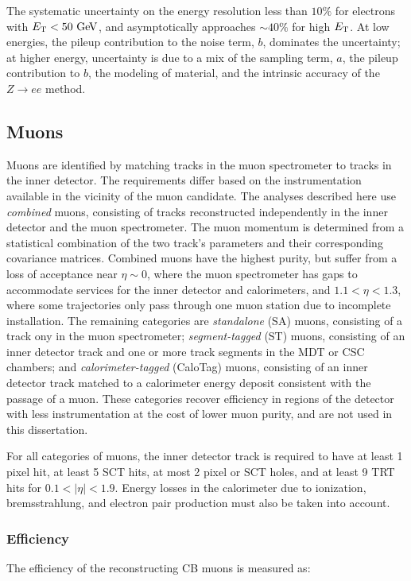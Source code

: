The systematic uncertainty on the energy resolution less than $10\%$ for electrons with $\Et<50 \GeV$, and asymptotically approaches $\sim 40\%$ for high $E_{\mathrm{T}}$. At low energies, the pileup contribution to the noise term, $b$, dominates the uncertainty; at higher energy, uncertainty is due to a mix of the sampling term, $a$, the pileup contribution to $b$, the modeling of material, and the intrinsic accuracy of the $Z\rightarrow ee$ method.


\subsection{Muons}\label{sec:event-reconstruction-muons}
Muons are identified by matching tracks in the muon spectrometer to tracks in the inner detector. The requirements differ based on the instrumentation available in the vicinity of the muon candidate. The analyses described here use \emph{combined} muons, consisting of tracks reconstructed independently in the inner detector and the muon spectrometer. The muon momentum is determined from a statistical combination of the two track's parameters and their corresponding covariance matrices. Combined muons have the highest purity, but suffer from a loss of acceptance near $\eta\sim 0$, where the muon spectrometer has gaps to accommodate services for the inner detector and calorimeters, and $1.1<\eta<1.3$, where some trajectories only pass through one muon station due to incomplete installation. The remaining categories are \emph{standalone} (SA) muons, consisting of a track ony in the muon spectrometer; \emph{segment-tagged} (ST) muons, consisting of an inner detector track and one or more track segments in the MDT or CSC chambers; and \emph{calorimeter-tagged} (CaloTag) muons, consisting of an inner detector track matched to a calorimeter energy deposit consistent with the passage of a muon. These categories recover efficiency in regions of the detector with less instrumentation at the cost of lower muon purity, and are not used in this dissertation. 

For all categories of muons, the inner detector track is required to have at least 1 pixel hit, at least 5 SCT hits, at most 2 pixel or SCT holes, and at least 9 TRT hits for $0.1<|\eta|<1.9$. Energy losses in the calorimeter due to ionization, bremsstrahlung, and electron pair production must also be taken into account. 

\subsubsection{Efficiency}\label{sec:reco-muon-efficiency}
The efficiency of the reconstructing CB muons is measured as:

